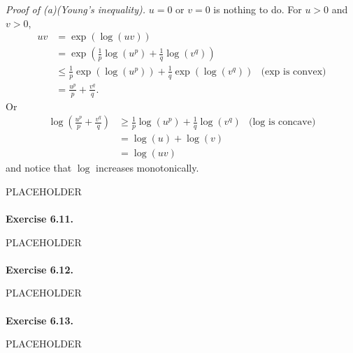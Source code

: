 \documentclass{article}
\begin{document}
\emph{Proof of (a)(Young's inequality).}
$u = 0$ or $v = 0$ is nothing to do.
For $u > 0$ and $v > 0$,
\begin{align*}
  uv
  &= \exp(\log(uv)) \\
  &= \exp(\frac{1}{p}\log(u^p) + \frac{1}{q}\log(v^q)) \\
  &\leq \frac{1}{p} \exp(\log(u^p)) + \frac{1}{q}\exp(\log(v^q))
    &\text{($\exp$ is convex)} \\
  &= \frac{u^p}{p} + \frac{v^q}{q}.
\end{align*}
Or
\begin{align*}
  \log(\frac{u^p}{p} + \frac{v^q}{q})
  &\geq \frac{1}{p} \log(u^p) + \frac{1}{q}\log(v^q)
    &\text{($\log$ is concave)} \\
  &= \log(u) + \log(v) \\
  &= \log(uv)
\end{align*}
and notice that $\log$ increases monotonically.



PLACEHOLDER \\\\






\textbf{Exercise 6.11.}

PLACEHOLDER \\\\






\textbf{Exercise 6.12.}

PLACEHOLDER \\\\






\textbf{Exercise 6.13.}

PLACEHOLDER \\\\



\end{document}
